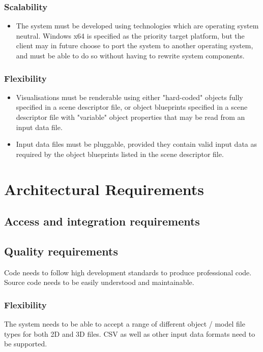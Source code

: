 \documentclass[a4paper,12pt]{article}
\begin{document}
	\subsubsection{Scalability}
	
		\begin{itemize}
			\item The system must be developed using technologies which are operating system neutral. Windows x64 is specified as the priority target platform, but the client may in future choose to port the system to another operating system, and must be able to do so without having to rewrite system components.
		\end{itemize}
	
	\subsubsection{Flexibility}
	
		\begin{itemize}
			\item Visualisations must be renderable using either "hard-coded" objects fully specified in a scene descriptor file, or object blueprints specified in a scene descriptor file with "variable" object properties that may be read from an input data file.
			\item Input data files must be pluggable, provided they contain valid input data as required by the object blueprints listed in the scene descriptor file.
		\end{itemize}
\section{Architectural Requirements}	%

\subsection{Access and integration requirements}

\subsection{Quality requirements}
Code needs to follow high development standards to produce professional code. Source code needs to be easily understood and maintainable.

\subsubsection{Flexibility}
The system needs to be able to accept a range of different object / model file types for both 2D and 3D files. CSV as well as other input data formats need to be supported.
\end{document}
